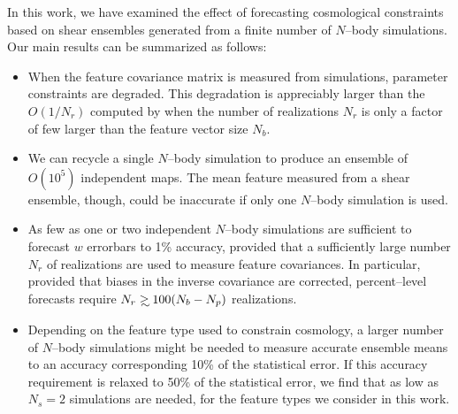\documentclass[reprint,aps,prd,superscriptaddress,showkeys,showpacs]{revtex4-1}
\newcommand\gsim{\mathrel{\rlap{\lower4pt\hbox{\hskip1pt$\sim$}}
        \raise1pt\hbox{$>$}}}
\begin{document}
In this work, we have examined the effect of forecasting cosmological
constraints based on shear ensembles generated from a finite number of
$N$--body simulations.  Our main results can be summarized as follows:
\vspace{0.4\baselineskip}
\begin{itemize}

\item When the feature covariance matrix is measured from simulations,
  parameter constraints are degraded. This degradation is appreciably
  larger than the $O(1/N_r)$ computed by \citep{DodelsonSchneider13}
  when the number of realizations $N_r$ is only a factor of few larger
  than the feature vector size $N_b$.
\item We can recycle a single $N$--body simulation to produce an
  ensemble of $O(10^5)$ independent maps. The mean feature measured
  from a shear ensemble, though, could be inaccurate if only one
  $N$--body simulation is used.
\item As few as one or two independent $N$--body simulations are
  sufficient to forecast $w$ errorbars to 1\% accuracy, provided that
  a sufficiently large number $N_r$ of realizations are used to
  measure feature covariances.  In particular, provided that biases
  in the inverse covariance are corrected, percent--level forecasts
  require $N_r\gsim 100 (N_b-N_p)$ realizations.
\item Depending on the feature type used to constrain cosmology, a
  larger number of $N$--body simulations might be needed to measure
  accurate ensemble means to an accuracy corresponding 10\% of the statistical error. If this accuracy requirement is relaxed to 50\% of the statistical error, we find that as low as $N_s=2$ simulations are needed, for the feature types we consider in this work. 
\end{itemize}
\end{document}
